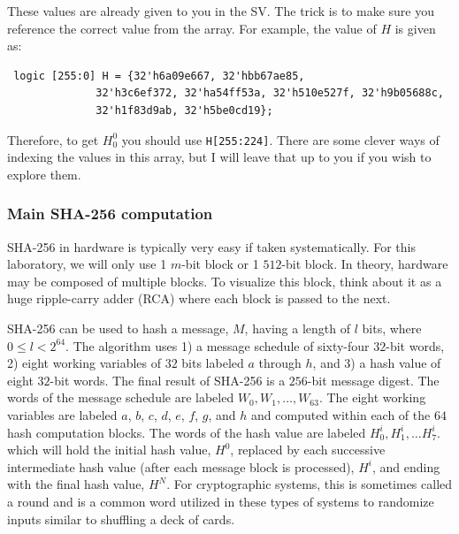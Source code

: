 \documentclass{article}
\begin{document}
These values are already given to you in the SV.  The trick is to make
sure you reference the correct value from the array.  For example, the
value of $H$ is given as:
\begin{verbatim}
 logic [255:0] H = {32'h6a09e667, 32'hbb67ae85,
		      32'h3c6ef372, 32'ha54ff53a, 32'h510e527f, 32'h9b05688c,
		      32'h1f83d9ab, 32'h5be0cd19};
\end{verbatim}
Therefore, to get $H_0^0$ you should  use \verb!H[255:224]!.  There are
some clever ways of indexing the values in this array, but I will
leave that up to you if you wish to explore them.

\subsubsection{Main SHA-256 computation}

SHA-256 in hardware is typically very easy if taken systematically.
For this laboratory, we will only use 1 $m$-bit block or 1 $512$-bit
block.  In theory, hardware may be composed of multiple blocks.  To
visualize this block, think about it as a huge ripple-carry adder (RCA)
where each block is passed to the next.

SHA-256 can be used to hash a message, $M$, having a length of $l$
bits, where $0 \leq l < 2^{64}$. The
algorithm uses 1) a message schedule of sixty-four $32$-bit words,
2) eight working variables of $32$
bits labeled $a$ through $h$, and 3) a hash value of eight $32$-bit words.
The final result of SHA-256 is a $256$-bit
message digest.
The words of the message schedule are labeled
$W_0, W_1, \ldots, W_{63}$. The
eight working variables are labeled $a$, $b$, $c$, $d$, $e$, $f$, $g$,
and $h$ and computed within each of the $64$ hash computation blocks.
The words of the hash value are labeled $H_0^i, H_1^i, \ldots H_7^i$.
which will hold the initial hash value, $H^0$, replaced by each
successive intermediate hash value
(after each message block is processed), $H^i$, and ending with the
final hash value, $H^N$.  For cryptographic systems, this is sometimes
called a round and is a common word utilized in these types of systems
to randomize inputs similar to shuffling a deck of cards.
\end{document}
